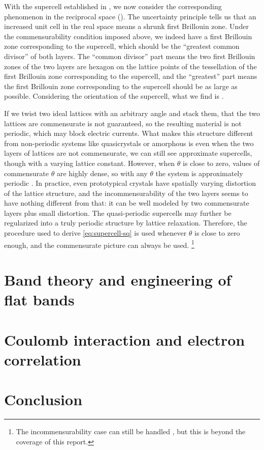 \documentclass[hyperref, a4paper]{article}
\begin{document}
With the supercell established in ,
we now consider the corresponding phenomenon in the reciprocal space
().
The uncertainty principle tells us that an increased unit cell in the real space 
means a shrunk first Brillouin zone.
Under the commensurability condition imposed above,
we indeed have a first Brillouin zone corresponding to the supercell,
which should be the ``greatest common divisor'' of both layers.
The ``common divisor'' part means the two first Brillouin zones of the two layers 
are hexagon on the lattice points of the tessellation 
of the first Brillouin zone corresponding to the supercell,
and the ``greatest'' part means the first Brillouin zone corresponding to the supercell
should be as large as possible.
Considering the orientation of the supercell,
what we find is .

If we twist two ideal lattices with an arbitrary angle and stack them,
that the two lattices are commensurate is not guaranteed,
so the resulting material is not periodic,
which may block electric currents.
What makes this structure different from non-periodic systems like quasicrystals or amorphous is 
even when the two layers of lattices are not commensurate,
we can still see approximate supercells,
though with a varying lattice constant.
However, when $\theta$ is close to zero,
values of commensurate $\theta$ are highly dense,
so with any $\theta$ the system is approximately periodic \cite{yao_quasicrystalline_2018}.
In practice, even prototypical crystals have spatially varying distortion of the lattice structure,
and the incommensurability of the two layers seems to have nothing different from that:
it can be well modeled by two commensurate layers plus small distortion.
The quasi-periodic supercells may further be regularized into a truly periodic structure by lattice relaxation.
Therefore, the procedure used to derive \eqref{eq:supercell-sq} is used
whenever $\theta$ is close to zero enough,
and the commensurate picture can always be used.%
\footnote{
    The incommensurability case can still be handled \cite{catarina_twisted_2019},  
    but this is beyond the coverage of this report.
}

\section{Band theory and engineering of flat bands}



\section{Coulomb interaction and electron correlation}

\section{Conclusion}



\end{document}
